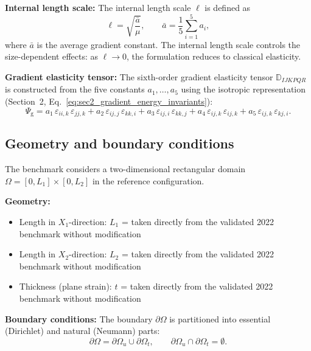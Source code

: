 \documentclass[11pt]{article}
\begin{document}
\textbf{Internal length scale:} The internal length scale $\ell$ is
defined as
\begin{equation}
\ell = \sqrt{\frac{\bar{a}}{\mu}},
\qquad
\bar{a} = \frac{1}{5}\sum_{i=1}^{5}a_{i},
\label{s8:length_scale}
\end{equation}
where $\bar{a}$ is the average gradient constant. The internal length
scale controls the size-dependent effects: as $\ell\to 0$, the
formulation reduces to classical elasticity.

\textbf{Gradient elasticity tensor:} The sixth-order gradient
elasticity tensor $\mathbb{D}_{IJKPQR}$ is constructed from the five
constants $a_{1},\ldots,a_{5}$ using the isotropic representation
(Section~2, Eq.~\eqref{eq:sec2_gradient_energy_invariants}):
\begin{equation}
\Psi_{\mathrm{g}} = a_{1}\,\varepsilon_{ii,k}\,\varepsilon_{jj,k}
+ a_{2}\,\varepsilon_{ij,j}\,\varepsilon_{kk,i}
+ a_{3}\,\varepsilon_{ij,i}\,\varepsilon_{kk,j}
+ a_{4}\,\varepsilon_{ij,k}\,\varepsilon_{ij,k}
+ a_{5}\,\varepsilon_{ij,k}\,\varepsilon_{kj,i}.
\label{s8:gradient_energy}
\end{equation}

\subsection{Geometry and boundary conditions}
\label{ssec:geometry}

The benchmark considers a two-dimensional rectangular domain
$\Omega = [0,L_{1}]\times[0,L_{2}]$ in the reference configuration.

\textbf{Geometry:}
\begin{itemize}
\item Length in $X_{1}$-direction: $L_{1}$ = taken directly from the validated 2022 benchmark without modification
\item Length in $X_{2}$-direction: $L_{2}$ = taken directly from the validated 2022 benchmark without modification
\item Thickness (plane strain): $t$ = taken directly from the validated 2022 benchmark without modification
\end{itemize}

\textbf{Boundary conditions:} The boundary $\partial\Omega$ is
partitioned into essential (Dirichlet) and natural (Neumann) parts:
\begin{equation}
\partial\Omega = \partial\Omega_{u} \cup \partial\Omega_{t},
\qquad
\partial\Omega_{u} \cap \partial\Omega_{t} = \emptyset.
\end{equation}
\end{document}
